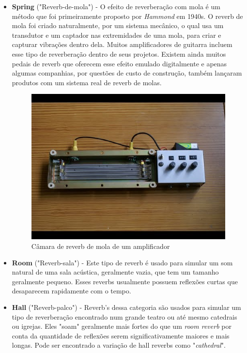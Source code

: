 		\begin{itemize}
			\item \textbf{Spring} ("Reverb-de-mola") - O efeito de reverberação com mola é um método que foi primeiramente proposto por \textit{Hammond} em 1940s. O reverb de mola foi criado naturalmente, por um sistema mecânico, o qual usa um transdutor e um captador nas extremidades de uma mola, para criar e capturar vibrações dentro dela. Muitos amplificadores de guitarra incluem esse tipo de reverberação dentro de seus projetos. Existem ainda muitos pedais de reverb que oferecem esse efeito emulado digitalmente e apenas algumas companhias, por questões de custo de construção, também lançaram produtos com um sistema real de reverb de molas.
			
			\begin{figure}[! h]
				\centering
				\includegraphics[scale=0.3]{./figuras/spring-reverb.jpg}
				\caption{Câmara de reverb de mola de um amplificador}
				\label{spring-reverb}
			\end{figure}
			
			\item \textbf{Room} ("Reverb-sala") - Este tipo de reverb é usado para simular um som natural de uma sala acústica, geralmente vazia, que tem um tamanho geralmente pequeno. Esses reverbs usualmente possuem reflexões curtas que desaparecem rapidamente com o tempo. 
			
			\item \textbf{Hall} ("Reverb-palco") - Reverb's dessa categoria são usados para simular um tipo de reverberação encontrado num grande teatro ou até mesmo catedrais ou igrejas. Eles "soam" geralmente mais fortes do que um \textit{room reverb} por conta da quantidade de reflexões serem significativamente maiores e mais longas. Pode ser encontrado a variação de hall reverbs como "\textit{cathedral}".
			

\end{itemize}
